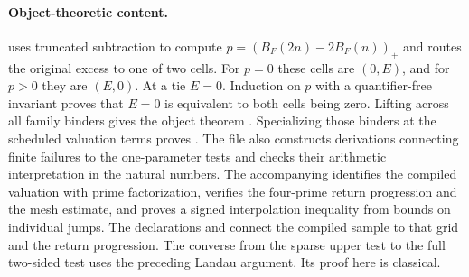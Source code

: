 \paragraph{Object-theoretic content.}
 uses truncated subtraction to compute $p=(B_F(2n)-2B_F(n))_+$ and routes the original excess to one of two cells. For $p=0$ these cells are $(0,E)$, and for $p>0$ they are $(E,0)$. At a tie $E=0$. Induction on $p$ with a quantifier-free invariant proves that $E=0$ is equivalent to both cells being zero. Lifting across all family binders gives the object theorem . Specializing those binders at the scheduled valuation terms proves . The file also constructs derivations connecting finite failures to the one-parameter tests and checks their arithmetic interpretation in the natural numbers. The accompanying  identifies the compiled valuation with prime factorization, verifies the four-prime return progression and the mesh estimate, and proves a signed interpolation inequality from bounds on individual jumps. The declarations  and  connect the compiled sample to that grid and the return progression. The converse from the sparse upper test to the full two-sided test uses the preceding Landau argument. Its proof here is classical.
